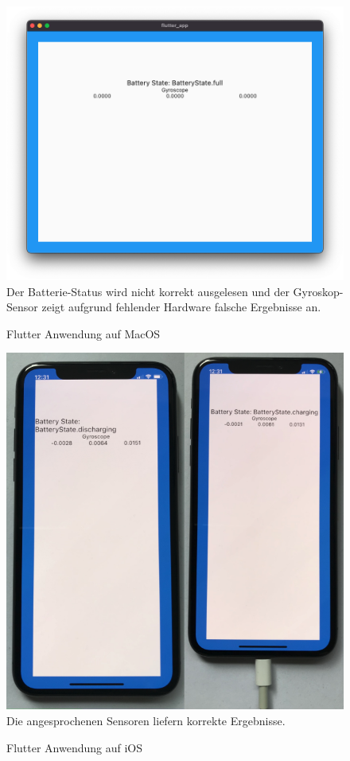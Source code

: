 \documentclass[a4paper]{scrartcl}
\begin{document}
\begin{figure}[H]
	\centering
	\caption{Flutter Anwendung auf MacOS}
	\includegraphics[scale=0.35]{_assets/Mac_Flutter_plugged.png} \\
	Der Batterie-Status wird nicht korrekt ausgelesen und der Gyroskop-Sensor zeigt aufgrund fehlender Hardware falsche Ergebnisse an.
\end{figure}

\begin{figure}[H]
	\centering
	\caption{Flutter Anwendung auf iOS}
	\includegraphics[scale=0.35]{_assets/iOS_Flutter.png} \\
	Die angesprochenen Sensoren liefern korrekte Ergebnisse.
\end{figure}
\end{document}
